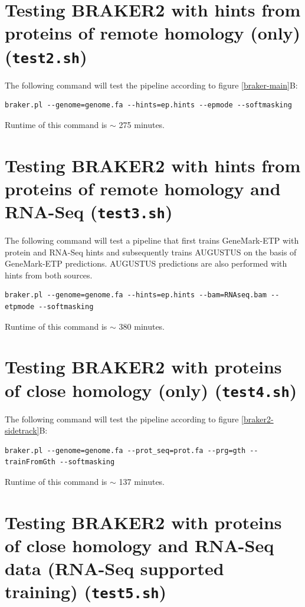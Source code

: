 \documentclass[a4paper,10pt]{report}
\begin{document}
\section{Testing BRAKER2 with hints from proteins of remote homology (only) (\texttt{test2.sh})}

The following command will test the pipeline according to figure \ref{braker-main}B:

\begin{verbatim}
braker.pl --genome=genome.fa --hints=ep.hints --epmode --softmasking
\end{verbatim}

Runtime of this command is $\sim$ 275 minutes.

\section{Testing BRAKER2 with hints from proteins of remote homology and RNA-Seq (\texttt{test3.sh})}

The following command will test a pipeline that first trains GeneMark-ETP with protein and RNA-Seq hints and subsequently trains AUGUSTUS on the basis of GeneMark-ETP predictions. AUGUSTUS predictions are also performed with hints from both sources.

\begin{verbatim}
braker.pl --genome=genome.fa --hints=ep.hints --bam=RNAseq.bam --etpmode --softmasking
\end{verbatim}

Runtime of this command is $\sim$ 380 minutes.

\section{Testing BRAKER2 with proteins of close homology (only) (\texttt{test4.sh})}

The following command will test the pipeline according to figure \ref{braker2-sidetrack}B:

\begin{verbatim}
braker.pl --genome=genome.fa --prot_seq=prot.fa --prg=gth --trainFromGth --softmasking
\end{verbatim}

Runtime of this command is $\sim$ 137 minutes.

\section{Testing BRAKER2 with proteins of close homology and RNA-Seq data (RNA-Seq supported training) (\texttt{test5.sh})}
\end{document}
